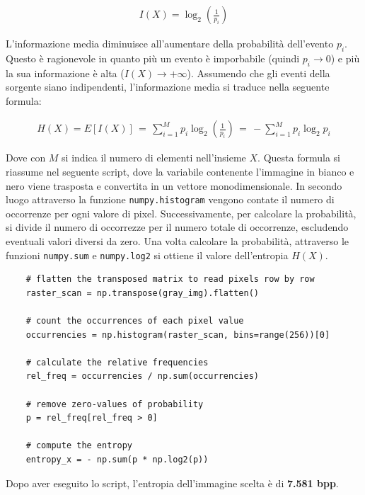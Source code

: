 \begin{gather*}
    I(X) = \log_2\left( \frac{1}{p_i} \right)
\end{gather*}

\noindent L'informazione media diminuisce all'aumentare della probabilità dell'evento $p_i$. Questo è ragionevole in quanto più un evento è imporbabile (quindi $p_i \to 0$) e più la sua informazione è alta ($I(X) \to +\infty$). Assumendo che gli eventi della sorgente siano indipendenti, l'informazione media si traduce nella seguente formula:

\begin{gather*}
    H(X) = E[I(X)] \, = \, \sum_{i = 1}^M p_i\log_2\left( \frac{1}{p_i} \right) \, = \, - \sum_{i = 1}^M p_i\log_2{p_i}
\end{gather*}

\noindent Dove con $M$ si indica il numero di elementi nell'insieme $X$. Questa formula si riassume nel seguente script, dove la variabile contenente l'immagine in bianco e nero viene trasposta e convertita in un vettore monodimensionale. In secondo luogo attraverso la funzione \texttt{numpy.histogram} vengono contate il numero di occorrenze per ogni valore di pixel. Successivamente, per calcolare la probabilità, si divide il numero di occorrezze per il numero totale di occorrenze, escludendo eventuali valori diversi da zero. Una volta calcolare la probabilità, attraverso le funzioni  \texttt{numpy.sum} e \texttt{numpy.log2} si ottiene il valore dell'entropia $H(X)$.


\begin{lstlisting}
    # flatten the transposed matrix to read pixels row by row
    raster_scan = np.transpose(gray_img).flatten()

    # count the occurrences of each pixel value
    occurrencies = np.histogram(raster_scan, bins=range(256))[0]

    # calculate the relative frequencies
    rel_freq = occurrencies / np.sum(occurrencies)

    # remove zero-values of probability
    p = rel_freq[rel_freq > 0]

    # compute the entropy
    entropy_x = - np.sum(p * np.log2(p))
\end{lstlisting}

\noindent Dopo aver eseguito lo script, l'entropia dell'immagine scelta è di \textbf{7.581 bpp}.



